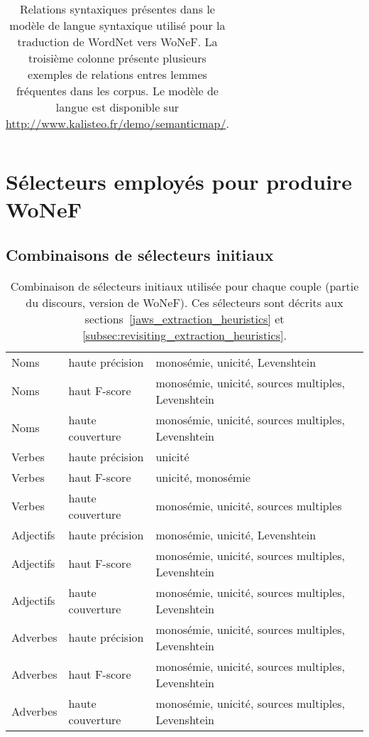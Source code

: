 \documentclass[oneside,parskip,draft]{scrbook}
\begin{document}
\begin{longtable}{lll}
    \caption{\label{table:relationswonef}Relations syntaxiques présentes dans
        le modèle de langue syntaxique utilisé pour la traduction de WordNet
        vers WoNeF. La troisième colonne présente plusieurs exemples de
        relations entres lemmes fréquentes dans les corpus. Le modèle de langue
    est disponible sur \protect\url{http://www.kalisteo.fr/demo/semanticmap/}.}
\end{longtable}



\section{Sélecteurs employés pour produire WoNeF}
\label{selecteurs_wonef}

\subsection{Combinaisons de sélecteurs initiaux}

\begin{table}[ht]
    \centering
    \begin{tabular}{lll}
        \toprule
        Noms &  haute précision &  monosémie, unicité, Levenshtein \\
        Noms &  haut F-score    &  monosémie, unicité, sources multiples, Levenshtein \\
        Noms &  haute couverture  &  monosémie, unicité, sources multiples, Levenshtein \\
        \midrule
        Verbes &  haute précision &  unicité \\
        Verbes &  haut F-score    &  unicité, monosémie \\
        Verbes &  haute couverture  &  monosémie, unicité, sources multiples \\
        \midrule
        Adjectifs  &  haute précision &  monosémie, unicité, Levenshtein \\
        Adjectifs  &  haut F-score    &  monosémie, unicité, sources multiples, Levenshtein \\
        Adjectifs  &  haute couverture  &  monosémie, unicité, sources multiples, Levenshtein \\
        \midrule
        Adverbes  &  haute précision &  monosémie, unicité, sources multiples, Levenshtein \\
        Adverbes  &  haut F-score    &  monosémie, unicité, sources multiples, Levenshtein \\
        Adverbes  &  haute couverture  &  monosémie, unicité, sources multiples, Levenshtein \\
        \bottomrule
    \end{tabular}
    \caption{Combinaison de sélecteurs initiaux utilisée pour chaque couple
    (partie du discours, version de WoNeF). Ces sélecteurs sont décrits aux
sections~\ref{jaws_extraction_heuristics} et
\ref{subsec:revisiting_extraction_heuristics}.}
\end{table}
\end{document}

